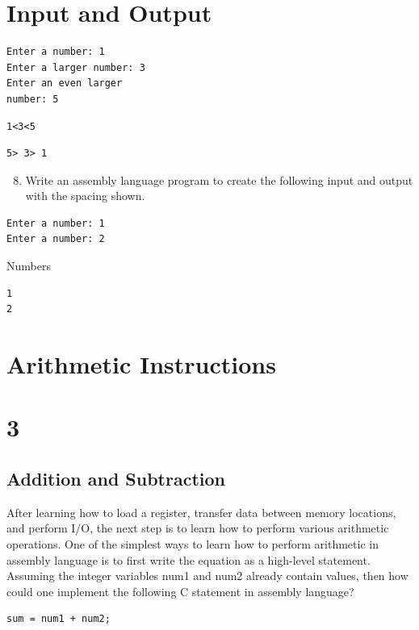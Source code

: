 \documentclass[10pt]{article}
\begin{document}
\section*{Input and Output}
\begin{verbatim}
Enter a number: 1
Enter a larger number: 3
Enter an even larger
number: 5
\end{verbatim}

\begin{verbatim}
1<3<5
\end{verbatim}

\begin{verbatim}
5> 3> 1
\end{verbatim}

\begin{enumerate}
  \setcounter{enumi}{7}
  \item Write an assembly language program to create the following input and output with the spacing shown.
\end{enumerate}

\begin{verbatim}
Enter a number: 1
Enter a number: 2
\end{verbatim}

Numbers

\begin{verbatim}
1
2
\end{verbatim}

\section*{Arithmetic Instructions}
\section*{3}
\subsection*{Addition and Subtraction}
After learning how to load a register, transfer data between memory locations, and perform I/O, the next step is to learn how to perform various arithmetic operations. One of the simplest ways to learn how to perform arithmetic in assembly language is to first write the equation as a high-level statement. Assuming the integer variables num1 and num2 already contain values, then how could one implement the following C statement in assembly language?

\begin{verbatim}
sum = num1 + num2;
\end{verbatim}
\end{document}
